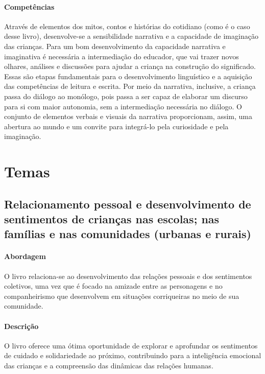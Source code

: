 \documentclass[11pt]{extarticle}
\begin{document}
\paragraph{Competências} 
Através de elementos dos mitos, contos e histórias do cotidiano (como é o caso desse livro), desenvolve-se a sensibilidade narrativa e a capacidade de imaginação das crianças. Para um bom desenvolvimento da capacidade narrativa e imaginativa é necessária a intermediação do educador, que vai trazer novos olhares, análises e discussões para ajudar a criança na construção do significado. Essas são etapas fundamentais para o desenvolvimento linguístico e a aquisição das competências de leitura e escrita. Por meio da narrativa, inclusive, a criança passa do diálogo ao monólogo, pois passa a ser capaz de elaborar um discurso para si com maior autonomia, sem a intermediação necessária no diálogo.
O conjunto de elementos verbais e visuais da narrativa proporcionam, assim,
uma abertura ao mundo e um convite para integrá-lo pela curiosidade e pela imaginação.


\section{Temas}

\subsection{Relacionamento pessoal e desenvolvimento de sentimentos de crianças nas escolas; nas famílias e nas comunidades (urbanas e rurais)}

\paragraph{Abordagem} O livro relaciona-se ao desenvolvimento das relações pessoais e dos sentimentos coletivos, uma vez que é focado na amizade entre as personagens e no companheirismo que desenvolvem em situações corriqueiras no meio de sua comunidade.

\paragraph{Descrição} O livro oferece uma ótima oportunidade de explorar 
e aprofundar os sentimentos de cuidado e solidariedade ao próximo, contribuindo para a inteligência emocional das crianças e a compreensão das dinâmicas das relações humanas.

\end{document}
